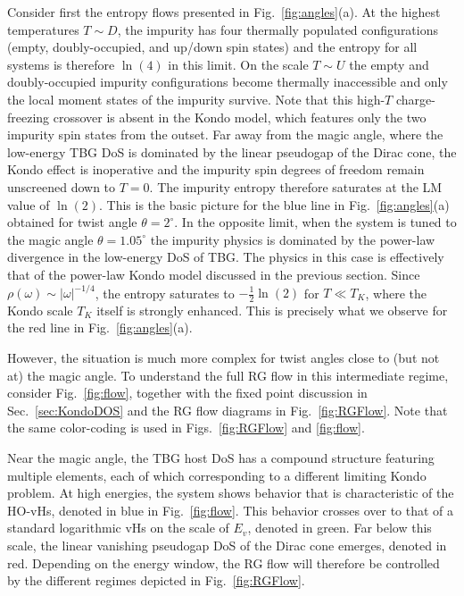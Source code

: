 Consider first the entropy flows presented in Fig.~\ref{fig:angles}(a). At the highest temperatures $T\sim D$, the impurity has four thermally populated configurations (empty, doubly-occupied, and up/down spin states) and the entropy for all systems is therefore $\ln(4)$ in this limit. On the scale $T \sim U$ the empty and doubly-occupied impurity configurations become thermally inaccessible and only the local moment states of the impurity survive. Note that this high-$T$ charge-freezing crossover is absent in the Kondo model, which features only the two impurity spin states from the outset. Far away from the magic angle, where the low-energy TBG DoS is dominated by the linear pseudogap of the Dirac cone, the Kondo effect is inoperative and the impurity spin degrees of freedom remain unscreened down to $T=0$. The impurity entropy therefore saturates at the LM value of $\ln(2)$. This is the basic picture for the blue line in Fig.~\ref{fig:angles}(a) obtained for twist angle $\theta=2^{\circ}$. In the opposite limit, when the system is tuned to the magic angle $\theta=1.05^{\circ}$  the impurity physics is dominated by the power-law divergence in the low-energy DoS of TBG. The physics in this case is effectively that of the power-law Kondo model discussed in the previous section. Since $\rho(\omega)\sim |\omega|^{-1/4}$, the entropy saturates to $-\tfrac{1}{2}\ln(2)$ for $T\ll T_K$, where the Kondo scale $T_K$ itself is strongly enhanced. This is precisely what we observe for the red line in Fig.~\ref{fig:angles}(a).

However, the situation is much more complex for twist angles close to (but not at) the magic angle. To understand the full RG flow in this intermediate regime, consider Fig.~\ref{fig:flow}, together with the fixed point discussion in Sec.~\ref{sec:KondoDOS} and the RG flow diagrams in Fig.~\ref{fig:RGFlow}. Note that the same color-coding is used in Figs.~\ref{fig:RGFlow} and \ref{fig:flow}.

Near the magic angle, the TBG host DoS has a compound structure featuring multiple elements, each of which corresponding to a different limiting Kondo problem. At high energies, the system shows behavior that is characteristic of the HO-vHs, denoted in blue in Fig.~\ref{fig:flow}. This behavior crosses over to that of a standard logarithmic vHs on the scale of $E_v$, denoted in green. Far below this scale, the linear vanishing pseudogap DoS of the Dirac cone emerges, denoted in red. Depending on the energy window, the RG flow will therefore be controlled by the different regimes depicted in  Fig.~\ref{fig:RGFlow}.


